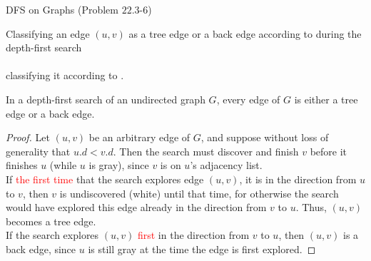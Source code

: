 \begin{frame}{}
  \begin{exampleblock}{DFS on  Graphs (Problem $22.3$-$6$)}
    \begin{center}
      Classifying an edge $(u,v)$ as a tree edge or a back edge 
      according to  during the depth-first search \\[6pt] 

       \\[6pt]
      
      classifying it according to .
    \end{center}
  \end{exampleblock}

\end{frame}

\begin{frame}{}

\end{frame}

\begin{frame}{}
  \begin{theorem}[Theorem $22.10$]
    In a depth-first search of an undirected graph $G$, 
    every edge of $G$ is either a tree edge or a back edge.
  \end{theorem}

  \begin{proof}
    Let $(u,v)$ be an arbitrary edge of $G$, 
    and suppose without loss of generality that $u.d < v.d$. 
    Then the search must discover and finish $v$ before it finishes $u$
    (while $u$ is gray), since $v$ is on $u$’s adjacency list. \\[6pt]

    If \textcolor<2->{red}{the first time} that the search explores edge $(u,v)$, 
    it is in the direction from $u$ to $v$, 
    then $v$ is undiscovered (white) until that time, 
    for otherwise the search would have explored this edge
    already in the direction from $v$ to $u$. 
    Thus, $(u,v)$ becomes a tree edge. \\[6pt]
    
    If the search explores $(u,v)$ \textcolor<2->{red}{first} in the direction from $v$ to $u$, 
    then $(u,v)$ is a back edge,
    since $u$ is still gray at the time the edge is first explored.
  \end{proof}
\end{frame}

